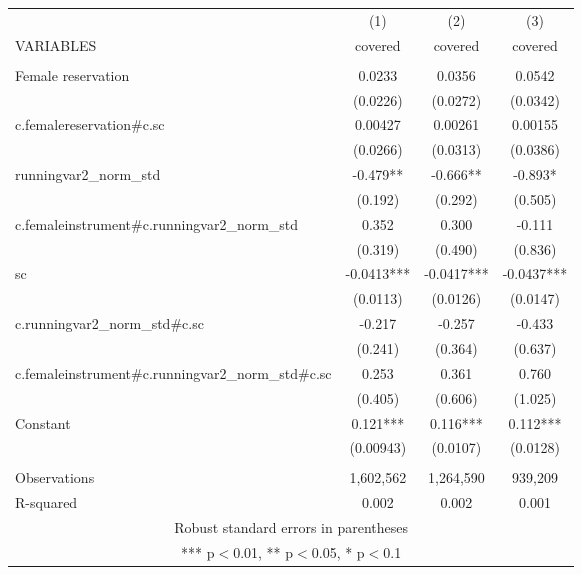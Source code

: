 \begin{tabular}{lccc} \hline
 & (1) & (2) & (3) \\
VARIABLES & covered & covered & covered \\ \hline
 &  &  &  \\
Female reservation & 0.0233 & 0.0356 & 0.0542 \\
 & (0.0226) & (0.0272) & (0.0342) \\
c.femalereservation\#c.sc & 0.00427 & 0.00261 & 0.00155 \\
 & (0.0266) & (0.0313) & (0.0386) \\
runningvar2\_norm\_std & -0.479** & -0.666** & -0.893* \\
 & (0.192) & (0.292) & (0.505) \\
c.femaleinstrument\#c.runningvar2\_norm\_std & 0.352 & 0.300 & -0.111 \\
 & (0.319) & (0.490) & (0.836) \\
sc & -0.0413*** & -0.0417*** & -0.0437*** \\
 & (0.0113) & (0.0126) & (0.0147) \\
c.runningvar2\_norm\_std\#c.sc & -0.217 & -0.257 & -0.433 \\
 & (0.241) & (0.364) & (0.637) \\
c.femaleinstrument\#c.runningvar2\_norm\_std\#c.sc & 0.253 & 0.361 & 0.760 \\
 & (0.405) & (0.606) & (1.025) \\
Constant & 0.121*** & 0.116*** & 0.112*** \\
 & (0.00943) & (0.0107) & (0.0128) \\
 &  &  &  \\
Observations & 1,602,562 & 1,264,590 & 939,209 \\
 R-squared & 0.002 & 0.002 & 0.001 \\ \hline
\multicolumn{4}{c}{ Robust standard errors in parentheses} \\
\multicolumn{4}{c}{ *** p$<$0.01, ** p$<$0.05, * p$<$0.1} \\
\end{tabular}
